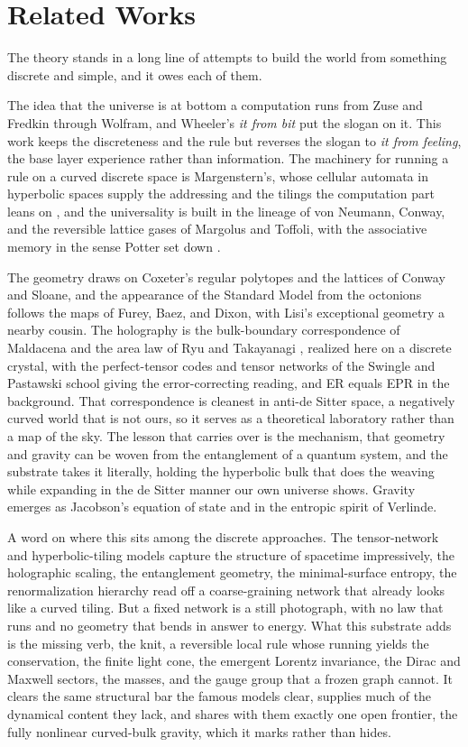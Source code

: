 \section{Related Works}

The theory stands in a long line of attempts to build the world from something discrete and simple, and it owes each of them.

The idea that the universe is at bottom a computation runs from Zuse and Fredkin through Wolfram, and Wheeler's \emph{it from bit} put the slogan on it. This work keeps the discreteness and the rule but reverses the slogan to \emph{it from feeling}, the base layer experience rather than information. The machinery for running a rule on a curved discrete space is Margenstern's, whose cellular automata in hyperbolic spaces supply the addressing and the tilings the computation part leans on \cite{margenstern2008, margenstern2013}, and the universality is built in the lineage of von Neumann, Conway, and the reversible lattice gases of Margolus and Toffoli, with the associative memory in the sense Potter set down \cite{potter1992}.

The geometry draws on Coxeter's regular polytopes and the lattices of Conway and Sloane, and the appearance of the Standard Model from the octonions follows the maps of Furey, Baez, and Dixon, with Lisi's exceptional geometry a nearby cousin. The holography is the bulk-boundary correspondence of Maldacena \cite{maldacena1998} and the area law of Ryu and Takayanagi \cite{ryu2006}, realized here on a discrete crystal, with the perfect-tensor codes and tensor networks of the Swingle and Pastawski school giving the error-correcting reading, and ER equals EPR in the background. That correspondence is cleanest in anti-de Sitter space, a negatively curved world that is not ours, so it serves as a theoretical laboratory rather than a map of the sky. The lesson that carries over is the mechanism, that geometry and gravity can be woven from the entanglement of a quantum system, and the substrate takes it literally, holding the hyperbolic bulk that does the weaving while expanding in the de Sitter manner our own universe shows. Gravity emerges as Jacobson's equation of state \cite{jacobson1995} and in the entropic spirit of Verlinde.

A word on where this sits among the discrete approaches. The tensor-network and hyperbolic-tiling models capture the structure of spacetime impressively, the holographic scaling, the entanglement geometry, the minimal-surface entropy, the renormalization hierarchy read off a coarse-graining network that already looks like a curved tiling. But a fixed network is a still photograph, with no law that runs and no geometry that bends in answer to energy. What this substrate adds is the missing verb, the knit, a reversible local rule whose running yields the conservation, the finite light cone, the emergent Lorentz invariance, the Dirac and Maxwell sectors, the masses, and the gauge group that a frozen graph cannot. It clears the same structural bar the famous models clear, supplies much of the dynamical content they lack, and shares with them exactly one open frontier, the fully nonlinear curved-bulk gravity, which it marks rather than hides.

